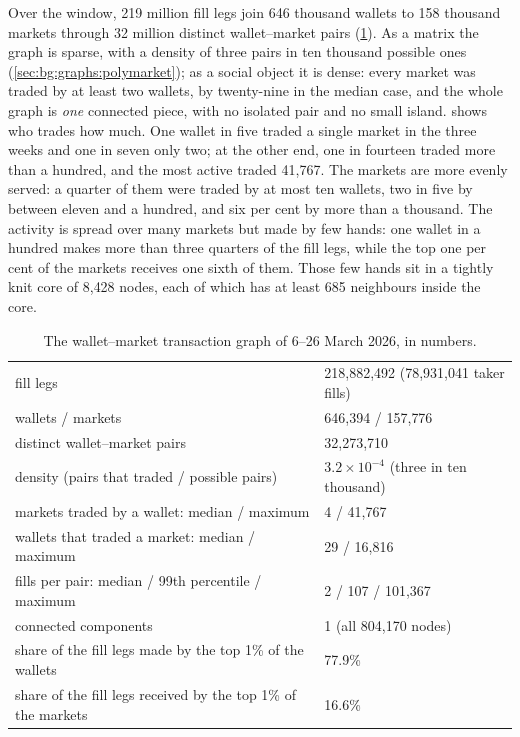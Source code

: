 Over the window, 219 million fill legs join 646 thousand wallets to 158 thousand markets
through 32 million distinct wallet--market pairs (\cref{tab:graph:stats}).  As a matrix
the graph is sparse, with a density of three pairs in ten thousand possible ones
(\cref{sec:bg:graphs:polymarket}); as a social object it is
dense: every market was traded by at least two wallets, by twenty-nine in the median case,
and the whole graph is \emph{one} connected piece, with no isolated pair and no small
island.   shows who trades how much.  One wallet in five traded a
single market in the three weeks and one in seven only two; at the other end, one in
fourteen traded more than a hundred, and the most active traded 41{,}767.  The markets are
more evenly served: a quarter of them were traded by at most ten wallets, two in five by
between eleven and a hundred, and six per cent by more than a thousand.  The activity is spread over many markets but made
by few hands: one wallet in a hundred makes more than three quarters of the fill legs,
while the top one per cent of the markets receives one sixth of them.  Those few hands sit
in a tightly knit core of 8{,}428 nodes, each of which has at least 685 neighbours inside
the core.

\begin{table}[t]
\centering
\caption{The wallet--market transaction graph of 6--26 March 2026, in numbers.}
\label{tab:graph:stats}
\small
\begin{fittable}\begin{tabular}{ll}
\toprule
fill legs & 218{,}882{,}492 (78{,}931{,}041 taker fills) \\
wallets / markets & 646{,}394 / 157{,}776 \\
distinct wallet--market pairs & 32{,}273{,}710 \\
density (pairs that traded / possible pairs) & $3.2 \times 10^{-4}$ (three in ten thousand) \\
markets traded by a wallet: median / maximum & 4 / 41{,}767 \\
wallets that traded a market: median / maximum & 29 / 16{,}816 \\
fills per pair: median / 99th percentile / maximum & 2 / 107 / 101{,}367 \\
connected components & 1 (all 804{,}170 nodes) \\
share of the fill legs made by the top 1\% of the wallets & 77.9\% \\
share of the fill legs received by the top 1\% of the markets & 16.6\% \\
\bottomrule
\end{tabular}\end{fittable}
\end{table}

